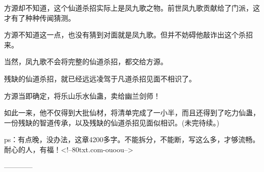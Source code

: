 \begin{this_body}
方源却不知道，这个仙道杀招实际上是凤九歌之物。前世凤九歌贡献给了门派，这才有了种种传闻猜测。

方源不知道这一点，也没有猜到对面就是凤九歌。但并不妨碍他敲诈出这个杀招来。

当然，凤九歌不会将完整的仙道杀招，都交给方源。

残缺的仙道杀招，就已经远远凌驾于凡道杀招见面不相识了。

方源当即确定，将乐山乐水仙蛊，卖给幽兰剑师！

如此一来，他不仅得到大批仙材，将清单完成了一小半，而且还得到了吃力仙蛊，一份残缺的智道传承，以及残缺的仙道杀招见面似相识。(未完待续。)

ps：有点晚，没办法，这章4200多字。不能拆分，不能断，写这么多，才够流畅。耐心的人，有福！<!--80txt.com-ouoou-->

------------

\end{this_body}

